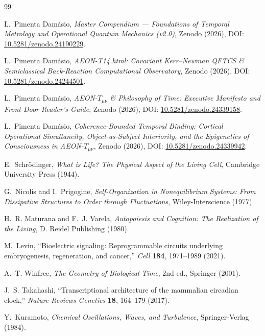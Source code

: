 \documentclass[11pt,a4paper]{article}
\begin{document}
\begin{thebibliography}{99}

L.~Pimenta Damásio, \emph{Master Compendium --- Foundations of Temporal Metrology and Operational Quantum Mechanics (v2.0)}, Zenodo (2026), DOI: \href{https://doi.org/10.5281/zenodo.24190229}{10.5281/zenodo.24190229}.

L.~Pimenta Damásio, \emph{AEON-T14.html: Covariant Kerr--Newman QFTCS \& Semiclassical Back-Reaction Computational Observatory}, Zenodo (2026), DOI: \href{https://doi.org/10.5281/zenodo.24244501}{10.5281/zenodo.24244501}.

L.~Pimenta Damásio, \emph{AEON-$T_{\mu\nu}$ \& Philosophy of Time: Executive Manifesto and Front-Door Reader's Guide}, Zenodo (2026), DOI: \href{https://doi.org/10.5281/zenodo.24339158}{10.5281/zenodo.24339158}.

L.~Pimenta Damásio, \emph{Coherence-Bounded Temporal Binding: Cortical Operational Simultaneity, Object-as-Subject Interiority, and the Epigenetics of Consciousness in AEON-$T_{\mu\nu}$}, Zenodo (2026), DOI: \href{https://doi.org/10.5281/zenodo.24339942}{10.5281/zenodo.24339942}.

E.~Schrödinger, \emph{What is Life? The Physical Aspect of the Living Cell}, Cambridge University Press (1944).

G.~Nicolis and I.~Prigogine, \emph{Self-Organization in Nonequilibrium Systems: From Dissipative Structures to Order through Fluctuations}, Wiley-Interscience (1977).

H.~R. Maturana and F.~J. Varela, \emph{Autopoiesis and Cognition: The Realization of the Living}, D. Reidel Publishing (1980).

M.~Levin, ``Bioelectric signaling: Reprogrammable circuits underlying embryogenesis, regeneration, and cancer,'' \emph{Cell} \textbf{184}, 1971--1989 (2021).

A.~T. Winfree, \emph{The Geometry of Biological Time}, 2nd ed., Springer (2001).

J.~S. Takahashi, ``Transcriptional architecture of the mammalian circadian clock,'' \emph{Nature Reviews Genetics} \textbf{18}, 164--179 (2017).

Y.~Kuramoto, \emph{Chemical Oscillations, Waves, and Turbulence}, Springer-Verlag (1984).


\end{thebibliography}
\end{document}
